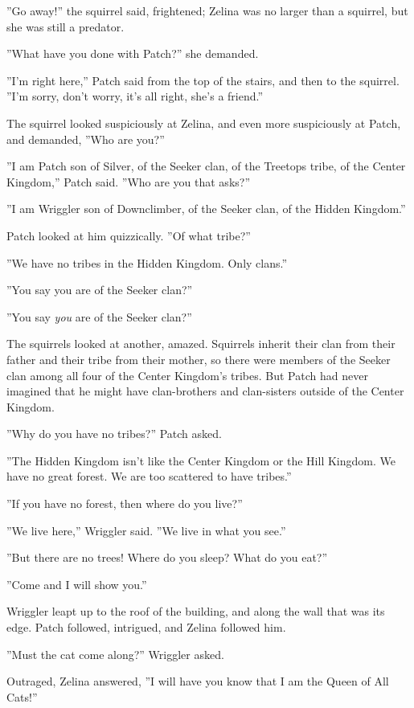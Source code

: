 \documentclass[12pt]{book}
\begin{document}
''Go away!'' the squirrel said, frightened; Zelina was no larger than a squirrel, but she was still a predator.

''What have you done with Patch?'' she demanded.

''I'm right here,'' Patch said from the top of the stairs, and then to the squirrel. ''I'm sorry, don't worry, it's all right, she's a friend.''

The squirrel looked suspiciously at Zelina, and even more suspiciously at Patch, and demanded, ''Who are you?''

''I am Patch son of Silver, of the Seeker clan, of the Treetops tribe, of the Center Kingdom,'' Patch said. ''Who are you that asks?''

''I am Wriggler son of Downclimber, of the Seeker clan, of the Hidden Kingdom.''

Patch looked at him quizzically. ''Of what tribe?''

''We have no tribes in the Hidden Kingdom. Only clans.''

''You say you are of the Seeker clan?''

''You say {\it you} are of the Seeker clan?''

The squirrels looked at another, amazed. Squirrels inherit their clan from their father and their tribe from their mother, so there were members of the Seeker clan among all four of the Center Kingdom's tribes. But Patch had never imagined that he might have clan-brothers and clan-sisters outside of the Center Kingdom.

''Why do you have no tribes?'' Patch asked.

''The Hidden Kingdom isn't like the Center Kingdom or the Hill Kingdom. We have no great forest. We are too scattered to have tribes.''

''If you have no forest, then where do you live?''

''We live here,'' Wriggler said. ''We live in what you see.''

''But there are no trees! Where do you sleep? What do you eat?''

''Come and I will show you.''

Wriggler leapt up to the roof of the building, and along the wall that was its edge. Patch followed, intrigued, and Zelina followed him.

''Must the cat come along?'' Wriggler asked.

Outraged, Zelina answered, ''I will have you know that I am the Queen of All Cats!''
\end{document}
